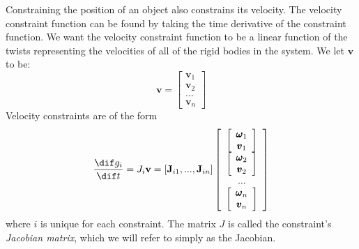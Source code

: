         Constraining the position of an object also constrains its velocity. The velocity constraint function can be found by taking the time derivative of the constraint function. We want the velocity constraint function to be a linear function of the twists representing the velocities of all of the rigid bodies in the system. We let $\mathbf{v}$ to be:
        \begin{equation}
            \mathbf{v} = \left[ \begin{array}{c}\mathbf{v}_1 \\\mathbf{v}_2 \\ ... \\ \mathbf{v}_n \end{array}\right]
        \end{equation}
        Velocity constraints are of the form
        \begin{equation}
            \frac{\dif g_i}{\dif t} = J_i \mathbf{v} = [\mathbf{J}_{i1} ,...,\mathbf{J}_{in} ]\left[\begin{array}{c}\left[\begin{array}{c}\pmb{\omega}_1 \\ \pmb{v}_1\end{array}\right] \\ \left[\begin{array}{c}\pmb{\omega}_2 \\ \pmb{v}_2\end{array}\right] \\ ... \\ \left[\begin{array}{c}\pmb{\omega}_n \\ \pmb{v}_n\end{array}\right]\end{array}\right]
        \end{equation}
        where $i$ is unique for each constraint. The matrix $J$ is called the constraint's \textit{Jacobian matrix}, which we will refer to simply as the Jacobian. \\

